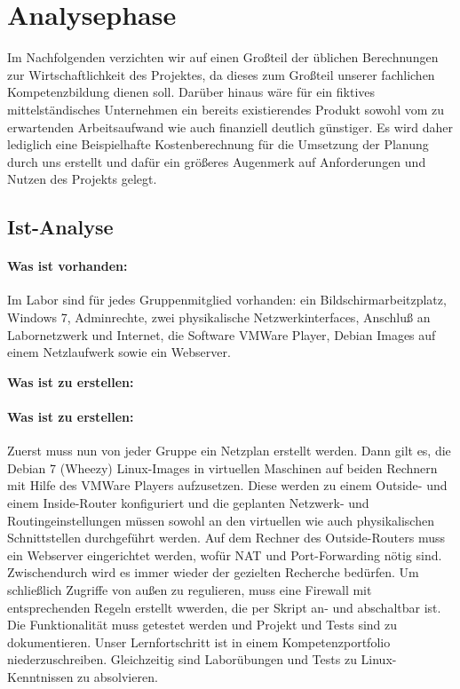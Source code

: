 \section{Analysephase} 
\label{sec:Analysephase}

Im Nachfolgenden verzichten wir auf einen Großteil der üblichen Berechnungen zur Wirtschaftlichkeit des Projektes, da dieses zum Großteil unserer fachlichen Kompetenzbildung dienen soll. Darüber hinaus wäre für ein fiktives mittelständisches Unternehmen ein bereits existierendes Produkt sowohl vom zu erwartenden Arbeitsaufwand wie auch finanziell deutlich günstiger. Es wird daher lediglich eine Beispielhafte Kostenberechnung für die Umsetzung der Planung durch uns erstellt und dafür ein größeres Augenmerk auf Anforderungen und Nutzen des Projekts gelegt. 

\subsection{Ist-Analyse} 
\label{sec:IstAnalyse}

\paragraph*{Was ist vorhanden: } Im Labor sind für jedes Gruppenmitglied vorhanden: ein Bildschirmarbeitzplatz, Windows 7, Adminrechte, zwei physikalische Netzwerkinterfaces, Anschluß an Labornetzwerk und Internet, die Software VMWare Player, Debian Images auf einem Netzlaufwerk sowie ein Webserver.
    
    \textbf{Was ist zu erstellen:}\\
\paragraph*{Was ist zu erstellen: } Zuerst muss nun von jeder Gruppe ein Netzplan erstellt werden. Dann gilt es, die Debian 7 (Wheezy) Linux-Images in virtuellen Maschinen auf beiden Rechnern mit Hilfe des VMWare Players aufzusetzen. Diese werden zu einem Outside- und einem Inside-Router konfiguriert und die geplanten Netzwerk- und Routingeinstellungen müssen sowohl an den virtuellen wie auch physikalischen Schnittstellen durchgeführt werden. Auf dem Rechner des Outside-Routers muss ein Webserver eingerichtet werden, wofür NAT und Port-Forwarding nötig sind. Zwischendurch wird es immer wieder der gezielten Recherche bedürfen. Um schließlich Zugriffe von außen zu regulieren, muss eine Firewall mit entsprechenden Regeln erstellt wwerden, die per Skript an- und abschaltbar ist. Die Funktionalität muss getestet werden und Projekt und Tests sind zu dokumentieren. Unser Lernfortschritt ist in einem Kompetenzportfolio niederzuschreiben. Gleichzeitig sind Laborübungen und Tests zu Linux-Kenntnissen zu absolvieren.

